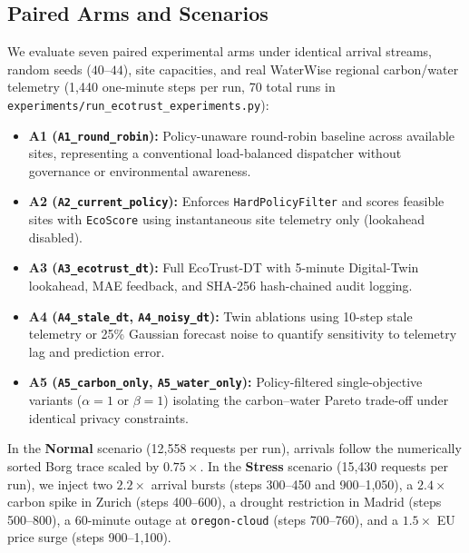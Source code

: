 \documentclass[conference]{IEEEtran}
\begin{document}
\subsection{Paired Arms and Scenarios}
We evaluate seven paired experimental arms under identical arrival streams, random seeds ($40$--$44$), site capacities, and real WaterWise regional carbon/water telemetry (1,440 one-minute steps per run, 70 total runs in \texttt{experiments/run\_ecotrust\_experiments.py}):
\begin{itemize}[leftmargin=*]
    \item \textbf{A1 (\texttt{A1\_round\_robin}):} Policy-unaware round-robin baseline across available sites, representing a conventional load-balanced dispatcher without governance or environmental awareness.
    \item \textbf{A2 (\texttt{A2\_current\_policy}):} Enforces \texttt{HardPolicyFilter} and scores feasible sites with \texttt{EcoScore} using instantaneous site telemetry only (lookahead disabled).
    \item \textbf{A3 (\texttt{A3\_ecotrust\_dt}):} Full EcoTrust-DT with 5-minute Digital-Twin lookahead, MAE feedback, and SHA-256 hash-chained audit logging.
    \item \textbf{A4 (\texttt{A4\_stale\_dt}, \texttt{A4\_noisy\_dt}):} Twin ablations using 10-step stale telemetry or 25\% Gaussian forecast noise to quantify sensitivity to telemetry lag and prediction error.
    \item \textbf{A5 (\texttt{A5\_carbon\_only}, \texttt{A5\_water\_only}):} Policy-filtered single-objective variants ($\alpha=1$ or $\beta=1$) isolating the carbon--water Pareto trade-off under identical privacy constraints.
\end{itemize}

In the \textbf{Normal} scenario (12,558 requests per run), arrivals follow the numerically sorted Borg trace scaled by $0.75\times$. In the \textbf{Stress} scenario (15,430 requests per run), we inject two $2.2\times$ arrival bursts (steps 300--450 and 900--1,050), a $2.4\times$ carbon spike in Zurich (steps 400--600), a drought restriction in Madrid (steps 500--800), a 60-minute outage at \texttt{oregon-cloud} (steps 700--760), and a $1.5\times$ EU price surge (steps 900--1,100).
\end{document}
